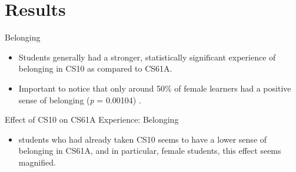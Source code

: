 \documentclass{beamer}                  %
\begin{document}
\section{Results}
\begin{frame}{Belonging}
\begin{itemize}
\item Students generally had a stronger, statistically significant experience of belonging in CS10 as compared to CS61A. 
\item Important to notice that only around 50\% of female learners had a positive sense of belonging (\emph{p} = 0.00104) . 
\end{itemize}
\end{frame}

\begin{frame}{Effect of CS10 on CS61A Experience: Belonging}
  \begin{itemize}
  \item students who had already taken CS10 seems to have a lower sense of belonging in CS61A, and in particular, female students, this effect seems magnified.
  \end{itemize}

  \begin{figure}[!htbp]
    \centering
  \end{figure}
\end{frame}
    
\end{document}
